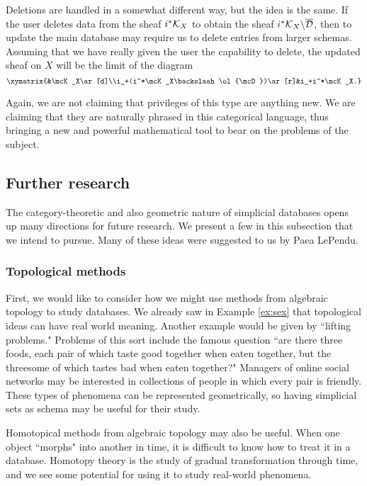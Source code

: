 \documentclass{amsart}
\begin{document}
Deletions are handled in a somewhat different way, but the idea is the same.  If the user deletes data from the sheaf $i^*\mathcal{K}_X$ to obtain the sheaf $i^*\mathcal{K}_X\backslash\overline{\mathcal{D}}$, then to update the main database may require us to delete entries from larger schemas.  Assuming that we have really given the user the capability to delete, the updated sheaf on $X$ will be the limit of the diagram $$\xymatrix{&\mcK_X\ar[d]\\i_+(i^*\mcK_X\backslash\ol{\mcD})\ar[r]&i_+i^*\mcK_X.}$$

Again, we are not claiming that privileges of this type are anything new.  We are claiming that they are naturally phrased in this categorical language, thus bringing a new and powerful mathematical tool to bear on the problems of the subject.

\subsection{Further research}\label{subsec:further research}

The category-theoretic and also geometric nature of simplicial databases opens up many directions for future research.  We present a few in this subsection that we intend to pursue.  Many of these ideas were suggested to us by Paea LePendu.

\subsubsection{Topological methods}

First, we would like to consider how we might use methods from algebraic topology to study databases.  We already saw in Example \ref{ex:sex} that topological ideas can have real world meaning.  Another example would be given by ``lifting problems."  Problems of this sort include the famous question ``are there three foods, each pair of which taste good together when eaten together, but the threesome of which tastes bad when eaten together?"  Managers of online social networks may be interested in collections of people in which every pair is friendly.  These types of phenomena can be represented geometrically, so having simplicial sets as schema may be useful for their study.

Homotopical methods from algebraic topology may also be useful.  When one object ``morphs" into another in time, it is difficult to know how to treat it in a database.  Homotopy theory is the study of gradual transformation through time, and we see some potential for using it to study real-world phenomena.
\end{document}
